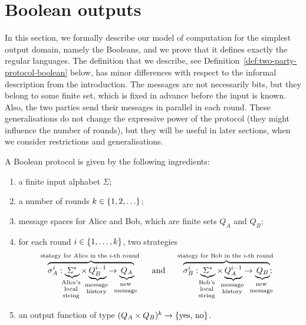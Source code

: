 
\section{Boolean outputs}
\label{sec:boolean-domain}
In this section, we formally describe our model of computation for the simplest output domain, namely the Booleans, and we prove that it defines exactly the regular languages.  The definition that we describe, see Definition~\ref{def:two-party-protocol-boolean} below, has minor differences with respect to the informal description from the introduction. The messages are not necessarily bits, but they belong to some finite set, which is fixed in advance before the input is known. Also,  the two parties send their messages in parallel in each round. 
 These generalisations do not change the expressive power of the protocol (they might influence the number of rounds), but they will be useful in later sections, when we consider restrictions and generalisations. 

\begin{definition}
    \label{def:two-party-protocol-boolean}
  A Boolean protocol 
   is given by the following ingredients: 
  \begin{enumerate}
    \item a finite input alphabet $\Sigma$;
    \item a number of rounds $k \in \{1,2,\ldots\}$;
    \item message spaces for Alice and Bob, which are finite sets $Q_A$ and $Q_B$;
    \item for each round $i \in \{1,\ldots,k\}$, two strategies
    \begin{align*}
    \myoverbrace{\sigma_A^i : \myunderbrace{\Sigma^*}{Alice's \\ local\\ string} \times \myunderbrace{Q_B^{i-1}}{message \\ history}  \to \myunderbrace{Q_A}{new\\ message}}{stategy for Alice in the $i$-th round}
    \qquad \text{and} \qquad 
        \myoverbrace{\sigma_B^i : \myunderbrace{\Sigma^*}{Bob's \\ local\\ string} \times \myunderbrace{Q_A^{i-1}}{message \\ history}  \to \myunderbrace{Q_B}{new\\ message}}{stategy for Bob in the $i$-th round};
    \end{align*}
    \item an output function of type $(Q_A \times Q_B)^{k} \to \{\text{yes, no}\}$.
  \end{enumerate}
\end{definition}

